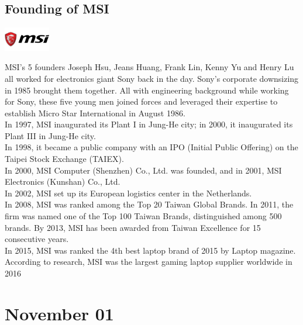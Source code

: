 \documentclass[11pt]{report}
\begin{document}
\subsection{Founding of MSI}
\vspace{2mm}\begin{center}\includegraphics[width=2cm]{./img/msiLogo.jpg}\end{center}
MSI's 5 founders Joseph Hsu, Jeans Huang, Frank Lin, Kenny Yu and Henry Lu all worked for electronics giant Sony back in the day. Sony's corporate downsizing in 1985 brought them together. All with engineering background while working for Sony, these five young men joined forces and leveraged their expertise to establish Micro Star International in August 1986.\\
\indent In 1997, MSI inaugurated its Plant I in Jung-He city; in 2000, it inaugurated its Plant III in Jung-He city.\\ \indent In 1998, it became a public company with an IPO (Initial Public Offering) on the Taipei Stock Exchange (TAIEX).\\ \indent In 2000, MSI Computer (Shenzhen) Co., Ltd. was founded, and in 2001, MSI Electronics (Kunshan) Co., Ltd.\\ \indent In 2002, MSI set up its European logistics center in the Netherlands.\\
\indent In 2008, MSI was ranked among the Top 20 Taiwan Global Brands. In 2011, the firm was named one of the Top 100 Taiwan Brands, distinguished among 500 brands. By 2013, MSI has been awarded from Taiwan Excellence for 15 consecutive years.\\
\indent In 2015, MSI was ranked the 4th best laptop brand of 2015 by Laptop magazine.\\
\indent According to research, MSI was the largest gaming laptop supplier worldwide in 2016
\section{November 01}
\end{document}
